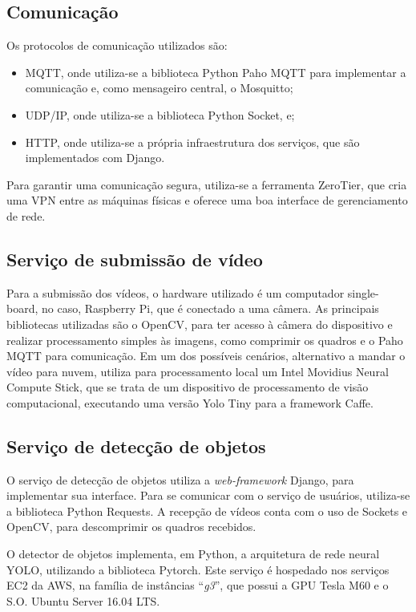\documentclass[]{politex}
\begin{document}
\subsection{Comunicação}
Os protocolos de comunicação utilizados são:
\begin{itemize}
    \item MQTT, onde utiliza-se a biblioteca Python Paho MQTT para implementar a comunicação e, como mensageiro central, o Mosquitto;
    \item UDP/IP, onde utiliza-se a biblioteca Python Socket, e;
    \item HTTP, onde utiliza-se a própria infraestrutura dos serviços, que são implementados com Django.
\end{itemize}

Para garantir uma comunicação segura, utiliza-se a ferramenta ZeroTier, que cria uma VPN entre as máquinas físicas e oferece uma boa interface de gerenciamento de rede.

\subsection{Serviço de submissão de vídeo}
Para a submissão dos vídeos, o hardware utilizado é um computador single-board, no caso, Raspberry Pi, que é conectado a uma câmera. As principais bibliotecas utilizadas são o OpenCV, para ter acesso à câmera do dispositivo e realizar processamento simples às imagens, como comprimir os quadros e o Paho MQTT para comunicação. Em um dos possíveis cenários, alternativo a mandar o vídeo para nuvem, utiliza para processamento local um Intel Movidius Neural Compute Stick, que se trata de um dispositivo de processamento de visão computacional, executando uma versão Yolo Tiny para a framework Caffe.

\subsection{Serviço de detecção de objetos}
O serviço de detecção de objetos utiliza a \textit{web-framework} Django, para implementar sua interface. Para se comunicar com o serviço de usuários, utiliza-se a biblioteca Python Requests. A recepção de vídeos conta com o uso de Sockets e OpenCV, para descomprimir os quadros recebidos.

O detector de objetos implementa, em Python, a arquitetura de rede neural YOLO, utilizando a biblioteca Pytorch. Este serviço é hospedado nos serviços EC2 da AWS, na família de instâncias “\textit{g3}”, que possui a GPU Tesla M60 e o S.O. Ubuntu Server 16.04 LTS.
\end{document}
